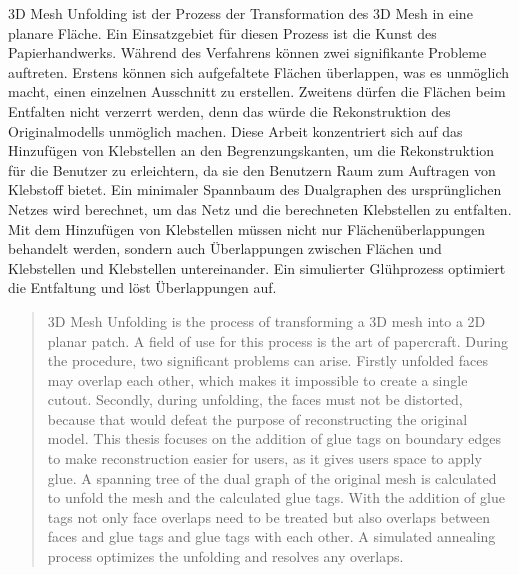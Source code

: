 \documentclass[draft,final]{vutinfth} %
\begin{document}
\begin{kurzfassung}
3D Mesh Unfolding ist der Prozess der Transformation des 3D Mesh in eine planare Fläche. Ein Einsatzgebiet für diesen Prozess ist die Kunst des Papierhandwerks. Während des Verfahrens können zwei signifikante Probleme auftreten. Erstens können sich aufgefaltete Flächen überlappen, was es unmöglich macht, einen einzelnen Ausschnitt zu erstellen. Zweitens dürfen die Flächen beim Entfalten nicht verzerrt werden, denn das würde die Rekonstruktion des Originalmodells unmöglich machen. Diese Arbeit konzentriert sich auf das Hinzufügen von Klebstellen an den Begrenzungskanten, um die Rekonstruktion für die Benutzer zu erleichtern, da sie den Benutzern Raum zum Auftragen von Klebstoff bietet. Ein minimaler Spannbaum des Dualgraphen des ursprünglichen Netzes wird berechnet, um das Netz und die berechneten Klebstellen zu entfalten. Mit dem Hinzufügen von Klebstellen müssen nicht nur Flächenüberlappungen behandelt werden, sondern auch Überlappungen zwischen Flächen und Klebstellen und Klebstellen untereinander. Ein simulierter Glühprozess optimiert die Entfaltung und löst Überlappungen auf.
\end{kurzfassung}

\begin{abstract}
3D Mesh Unfolding is the process of transforming a 3D mesh into a 2D planar patch. A field of use for this process is the art of papercraft. During the procedure, two significant problems can arise. Firstly unfolded faces may overlap each other, which makes it impossible to create a single cutout. Secondly, during unfolding, the faces must not be distorted, because that would defeat the purpose of reconstructing the original model. This thesis focuses on the addition of glue tags on boundary edges to make reconstruction easier for users, as it gives users space to apply glue. A spanning tree of the dual graph of the original mesh is calculated to unfold the mesh and the calculated glue tags. With the addition of glue tags not only face overlaps need to be treated but also overlaps between faces and glue tags and glue tags with each other. A simulated annealing process optimizes the unfolding and resolves any overlaps.
\end{abstract}


\tableofcontents %
\end{document}
